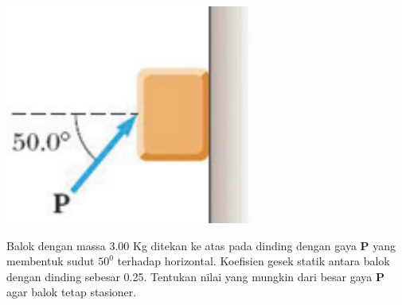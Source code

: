 \item
\mbox{}
\begin{center}
\includegraphics [scale=0.6]{./latex/eps/1_5_14_image_1-eps-converted-to.pdf}
\end{center}

Balok dengan massa 3.00 Kg ditekan ke atas pada dinding dengan gaya \textbf{P} yang membentuk sudut $50^{0}$ terhadap horizontal. Koefisien gesek statik antara balok dengan dinding sebesar 0.25. Tentukan nilai yang mungkin dari besar gaya \textbf{P} agar balok tetap stasioner.

